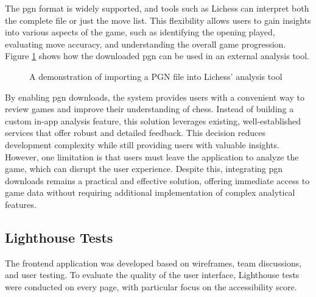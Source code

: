 The \gls{pgn} format is widely supported, and tools such as Lichess can interpret both the complete file or just the move list. This flexibility allows users to gain insights into various aspects of the game, such as identifying the opening played, evaluating move accuracy, and understanding the overall game progression. Figure \ref{fig:downloaded-pgn-analysis} shows how the downloaded \gls{pgn} can be used in an external analysis tool. \\

\begin{figure}[h!] \centering {}\caption[Lichess analysis tool]{A demonstration of importing a PGN file into Lichess' analysis tool}\label{fig:downloaded-pgn-analysis} \end{figure}

By enabling \gls{pgn} downloads, the system provides users with a convenient way to review games and improve their understanding of chess. Instead of building a custom in-app analysis feature, this solution leverages existing, well-established services that offer robust and detailed feedback. This decision reduces development complexity while still providing users with valuable insights. \\

However, one limitation is that users must leave the application to analyze the game, which can disrupt the user experience. Despite this, integrating \gls{pgn} downloads remains a practical and effective solution, offering immediate access to game data without requiring additional implementation of complex analytical features.

\subsection{Lighthouse Tests}
The frontend application was developed based on wireframes, team discussions, and user testing. To evaluate the quality of the user interface, Lighthouse tests were conducted on every page, with particular focus on the accessibility score. \\

